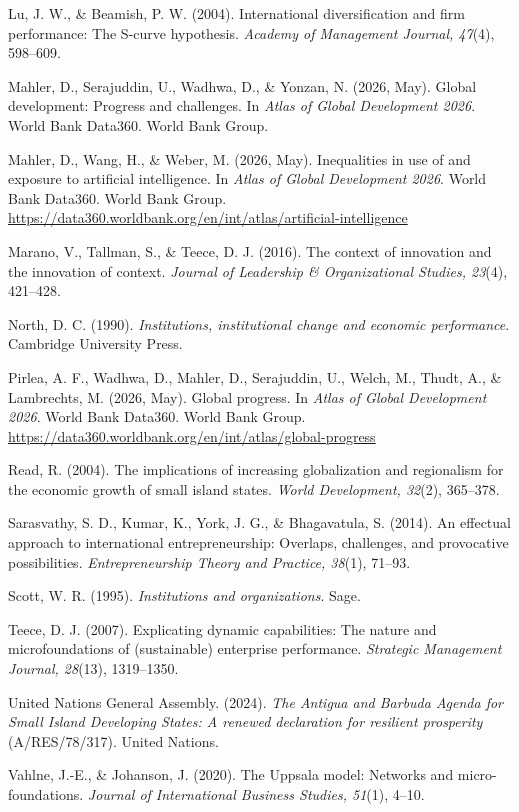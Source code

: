 \documentclass[12pt,a4paper]{article}
\begin{document}
Lu, J. W., \& Beamish, P. W. (2004). International diversification and
firm performance: The S-curve hypothesis. \emph{Academy of Management
Journal, 47}(4), 598--609.

Mahler, D., Serajuddin, U., Wadhwa, D., \& Yonzan, N. (2026, May).
Global development: Progress and challenges. In \emph{Atlas of Global
Development 2026}. World Bank Data360. World Bank Group.

Mahler, D., Wang, H., \& Weber, M. (2026, May). Inequalities in use of
and exposure to artificial intelligence. In \emph{Atlas of Global
Development 2026}. World Bank Data360. World Bank Group.
\url{https://data360.worldbank.org/en/int/atlas/artificial-intelligence}

Marano, V., Tallman, S., \& Teece, D. J. (2016). The context of
innovation and the innovation of context. \emph{Journal of Leadership \&
Organizational Studies, 23}(4), 421--428.

North, D. C. (1990). \emph{Institutions, institutional change and
economic performance}. Cambridge University Press.

Pirlea, A. F., Wadhwa, D., Mahler, D., Serajuddin, U., Welch, M., Thudt,
A., \& Lambrechts, M. (2026, May). Global progress. In \emph{Atlas of
Global Development 2026}. World Bank Data360. World Bank Group.
\url{https://data360.worldbank.org/en/int/atlas/global-progress}

Read, R. (2004). The implications of increasing globalization and
regionalism for the economic growth of small island states. \emph{World
Development, 32}(2), 365--378.

Sarasvathy, S. D., Kumar, K., York, J. G., \& Bhagavatula, S. (2014). An
effectual approach to international entrepreneurship: Overlaps,
challenges, and provocative possibilities. \emph{Entrepreneurship Theory
and Practice, 38}(1), 71--93.

Scott, W. R. (1995). \emph{Institutions and organizations}. Sage.

Teece, D. J. (2007). Explicating dynamic capabilities: The nature and
microfoundations of (sustainable) enterprise performance.
\emph{Strategic Management Journal, 28}(13), 1319--1350.

United Nations General Assembly. (2024). \emph{The Antigua and Barbuda
Agenda for Small Island Developing States: A renewed declaration for
resilient prosperity} (A/RES/78/317). United Nations.

Vahlne, J.-E., \& Johanson, J. (2020). The Uppsala model: Networks and
micro-foundations. \emph{Journal of International Business Studies,
51}(1), 4--10.
\end{document}
